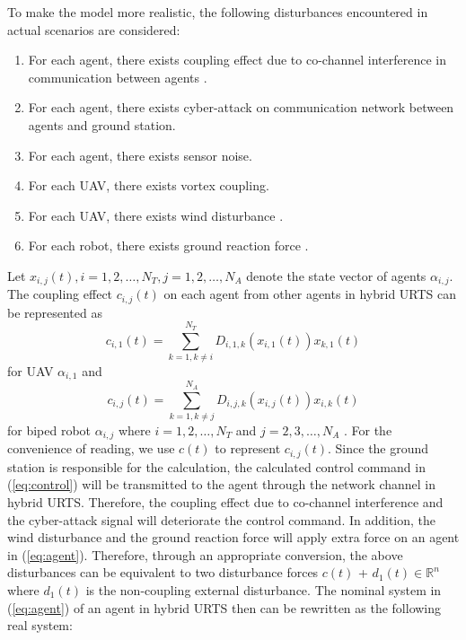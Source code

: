 \documentclass[journal,12pt,onecolumn,draftclsnofoot,]{IEEEtran}
\begin{document}
To make the model more realistic, the following disturbances encountered in actual scenarios are considered:
\begin{enumerate}
    \item For each agent, there exists coupling effect due to co-channel interference in communication between agents \cite{9834947}.
    \item For each agent, there exists cyber-attack on communication network between agents and ground station.
    \item For each agent, there exists sensor noise.
    \item For each UAV, there exists vortex coupling.
    \item For each UAV, there exists wind disturbance \cite{9075385}.
    \item For each robot, there exists ground reaction force \cite{chen2013human}. 
\end{enumerate}
Let $x_{i,j}(t), i=1,2,\dots,N_T, j=1,2,\dots,N_A$ denote the state vector of agents $\alpha_{i,j}$. The coupling effect $c_{i,j}(t)$ on each agent from other agents in hybrid URTS can be represented as \begin{equation} \label{eq:UAV couple}
    c_{i,1}(t) = \sum_{k = 1, k \neq i}^{N_T}D_{i, 1, k}(x_{i, 1}(t))x_{k, 1}(t)
\end{equation} for UAV $\alpha_{i, 1}$ and \begin{equation} \label{eq:robot couple}
    c_{i,j}(t) = \sum_{k = 1, k \neq j}^{N_A}D_{i, j, k}(x_{i, j}(t))x_{i, k}(t)
\end{equation} for biped robot $\alpha_{i, j}$ where $i=1,2,\dots,N_T$ and $j=2,3,\dots,N_A$ \cite{9834947}. For the convenience of reading, we use $c(t)$ to represent $c_{i,j}(t)$. Since the ground station is responsible for the calculation, the calculated control command in (\ref{eq:control}) will be transmitted to the agent through the network channel in hybrid URTS. Therefore, the coupling effect due to co-channel interference and the cyber-attack signal will deteriorate the control command. In addition, the wind disturbance and the ground reaction force will apply extra force on an agent in (\ref{eq:agent}). Therefore, through an appropriate conversion, the above disturbances can be equivalent to two disturbance forces $c(t)$ + $d_1(t)\in\mathbb{R}^n$ where $d_1(t)$ is the non-coupling external disturbance. The nominal system in (\ref{eq:agent}) of an agent in hybrid URTS then can be rewritten as the following real system:
\end{document}
